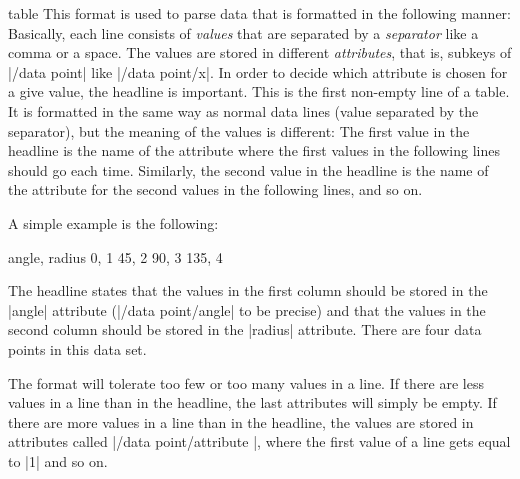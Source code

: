 \begin{dataformat}{table}
    This format is used to parse data that is formatted in the following
    manner: Basically, each line consists of \emph{values} that are separated
    by a \emph{separator} like a comma or a space. The values are stored in
    different \emph{attributes}, that is, subkeys of |/data point| like
    |/data point/x|. In order to decide which attribute is chosen for a give
    value, the headline is important. This is the first non-empty line of a
    table. It is formatted in the same way as normal data lines (value
    separated by the separator), but the meaning of the values is different:
    The first value in the headline is the name of the attribute where the
    first values in the following lines should go each time. Similarly, the
    second value in the headline is the name of the attribute for the second
    values in the following lines, and so on.

    A simple example is the following:
\begin{codeexample}
angle, radius
0, 1
45, 2
90, 3
135, 4
\end{codeexample}
    The headline states that the values in the first column should be stored in
    the |angle| attribute (|/data point/angle| to be precise) and that the
    values in the second column should be stored in the |radius| attribute.
    There are four data points in this data set.

    The format will tolerate too few or too many values in a line. If there are
    less values in a line than in the headline, the last attributes will simply
    be empty. If there are more values in a line than in the headline, the
    values are stored in attributes called |/data point/attribute |, where the first value of a line gets  equal to
    |1| and so on.


\end{dataformat}
